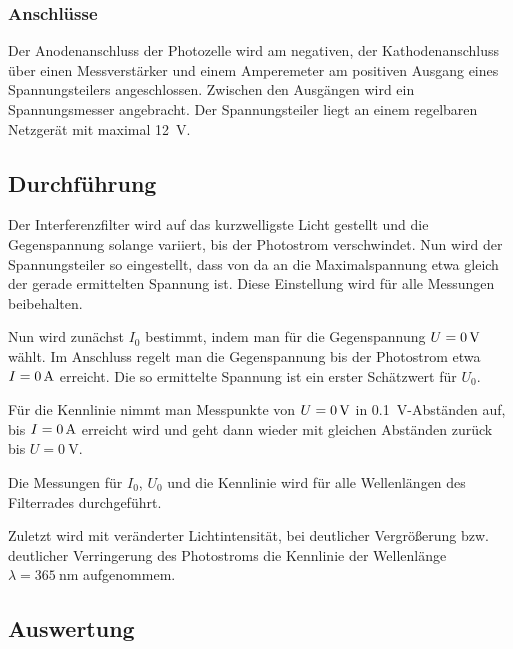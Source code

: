 \FloatBarrier
\subsubsection{Anschlüsse}

Der Anodenanschluss der Photozelle wird am negativen, der Kathodenanschluss
über einen Messverstärker und einem Amperemeter am positiven Ausgang eines
Spannungsteilers angeschlossen. Zwischen den Ausgängen wird ein Spannungsmesser
angebracht. Der Spannungsteiler liegt an einem regelbaren Netzgerät mit maximal
\SI{12}{\volt}.

\FloatBarrier
\subsection{Durchführung}

Der Interferenzfilter wird auf das kurzwelligste Licht gestellt und die
Gegenspannung solange variiert, bis der Photostrom verschwindet. Nun wird der
Spannungsteiler so eingestellt, dass von da an die Maximalspannung etwa gleich
der gerade ermittelten Spannung ist. Diese Einstellung wird für alle Messungen
beibehalten.

Nun wird zunächst $I_0$ bestimmt, indem man für die Gegenspannung $U =
\SI0{\volt}$ wählt. Im Anschluss regelt man die Gegenspannung bis der
Photostrom etwa $I = \SI0{\ampere}$ erreicht. Die so ermittelte Spannung ist
ein erster Schätzwert für $U_0$.

Für die Kennlinie nimmt man Messpunkte von $U = \SI0{\volt}$ in
\SI{0.1}{\volt}-Abständen auf, bis $I = \SI0{\ampere}$ erreicht wird und geht
dann wieder mit gleichen Abständen zurück bis $U = \SI{0}{\volt}$.

Die Messungen für $I_0$, $U_0$ und die Kennlinie wird für alle Wellenlängen des
Filterrades durchgeführt.

Zuletzt wird mit veränderter Lichtintensität, bei deutlicher Vergrößerung bzw.
deutlicher Verringerung des Photostroms die Kennlinie der Wellenlänge $\lambda
= \SI{365}{\nano\meter}$ aufgenommem.


\FloatBarrier
\subsection{Auswertung}


